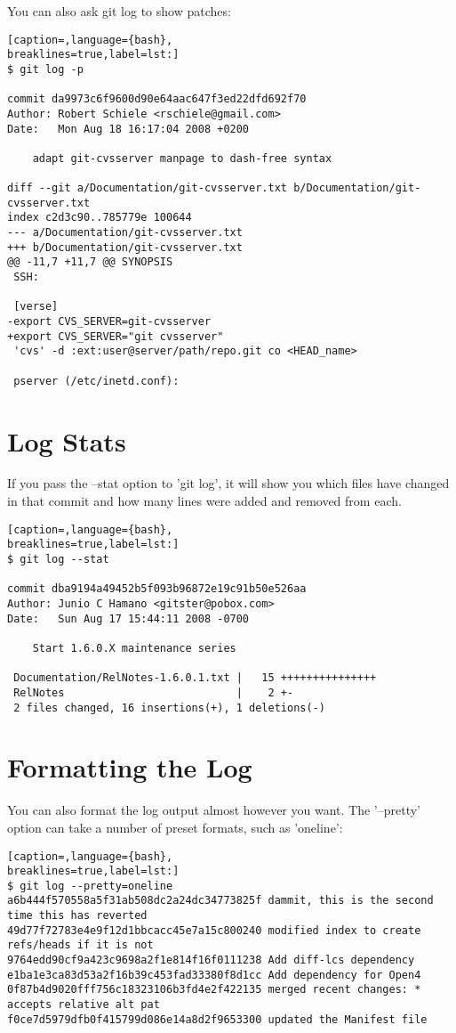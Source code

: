 You can also ask git log to show patches:
\lstset{basicstyle=\scriptsize, numbers=none, captionpos=b, tabsize=4}
\begin{lstlisting}[caption=,language={bash},
breaklines=true,label=lst:]
$ git log -p

commit da9973c6f9600d90e64aac647f3ed22dfd692f70
Author: Robert Schiele <rschiele@gmail.com>
Date:   Mon Aug 18 16:17:04 2008 +0200

    adapt git-cvsserver manpage to dash-free syntax

diff --git a/Documentation/git-cvsserver.txt b/Documentation/git-cvsserver.txt
index c2d3c90..785779e 100644
--- a/Documentation/git-cvsserver.txt
+++ b/Documentation/git-cvsserver.txt
@@ -11,7 +11,7 @@ SYNOPSIS
 SSH:

 [verse]
-export CVS_SERVER=git-cvsserver
+export CVS_SERVER="git cvsserver"
 'cvs' -d :ext:user@server/path/repo.git co <HEAD_name>

 pserver (/etc/inetd.conf):
\end{lstlisting}

\section{Log Stats}

If you pass the --stat option to 'git log', it will show you which files have
changed in that commit and how many lines were added and removed from each.
\lstset{basicstyle=\scriptsize, numbers=none, captionpos=b, tabsize=4}
\begin{lstlisting}[caption=,language={bash},
breaklines=true,label=lst:]
$ git log --stat

commit dba9194a49452b5f093b96872e19c91b50e526aa
Author: Junio C Hamano <gitster@pobox.com>
Date:   Sun Aug 17 15:44:11 2008 -0700

    Start 1.6.0.X maintenance series

 Documentation/RelNotes-1.6.0.1.txt |   15 +++++++++++++++
 RelNotes                           |    2 +-
 2 files changed, 16 insertions(+), 1 deletions(-)
\end{lstlisting}

\section{Formatting the Log}
You can also format the log output almost however you want. The '--pretty'
option can take a number of preset formats, such as 'oneline':
\lstset{basicstyle=\scriptsize, numbers=none, captionpos=b, tabsize=4}
\begin{lstlisting}[caption=,language={bash},
breaklines=true,label=lst:]
$ git log --pretty=oneline
a6b444f570558a5f31ab508dc2a24dc34773825f dammit, this is the second time this has reverted
49d77f72783e4e9f12d1bbcacc45e7a15c800240 modified index to create refs/heads if it is not 
9764edd90cf9a423c9698a2f1e814f16f0111238 Add diff-lcs dependency
e1ba1e3ca83d53a2f16b39c453fad33380f8d1cc Add dependency for Open4
0f87b4d9020fff756c18323106b3fd4e2f422135 merged recent changes: * accepts relative alt pat
f0ce7d5979dfb0f415799d086e14a8d2f9653300 updated the Manifest file
\end{lstlisting}

